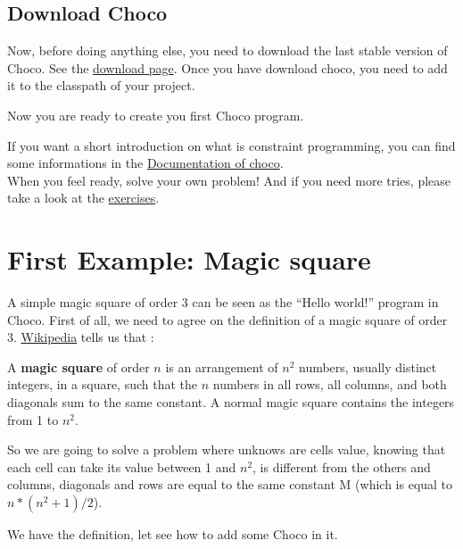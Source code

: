 \section{Download Choco}\label{gettingstarted:downloadchoco}\hypertarget{gettingstarted:downloadchoco}{}
Now, before doing anything else, you need to download the last stable version of Choco. See the \href{http://www.emn.fr/z-info/choco-solver/choco-download.html}{download page}. 
Once you have download choco, you need to add it to the classpath of your project.

Now you are ready to create you first Choco program.

If you want a short introduction on what is constraint programming, you can find some informations in the \href{http://www.emn.fr/z-info/choco-solver/choco-documentation.html}{Documentation of choco}.\\
When you feel ready, solve your own problem! And if you need more tries, please take a look at the \hyperlink{exercises}{exercises}. %

\chapter{First Example: Magic square}\label{gettingstarted:firstexample:magicsquare}\hypertarget{gettingstarted:firstexample:magicsquare}{}
A simple magic square of order 3 can be seen as the ``Hello world!'' program in Choco. First of all, we need to agree on the definition of a magic square of order 3.
\href{http://en.wikipedia.org/wiki/Magic_square}{Wikipedia} tells us that :
\begin{myquote}
A \textbf{magic square} of order $n$ is an arrangement of $n^2$ numbers, usually distinct integers, in a square, such that the $n$ numbers in all rows, all columns, and both diagonals sum to the same constant. A normal magic square contains the integers from 1 to $n^2$.
\end{myquote}

So we are going to solve a problem where unknows are cells value, knowing that each cell can take its value between 1 and $n^2$, is different from the others and columns, diagonals and rows are equal to the same constant M (which is equal to $n * (n^2 + 1) / 2$).

We have the definition, let see how to add some Choco in it.

